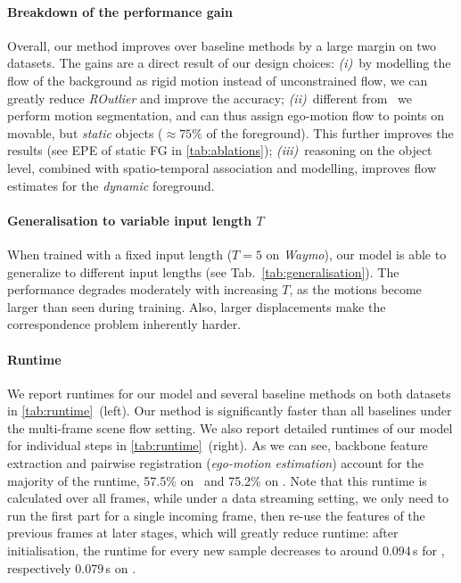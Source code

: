\paragraph{Breakdown of the performance gain}
Overall, our method improves over baseline methods by a large margin on two datasets. The gains are a direct result of our design choices: \textit{(i)}~by modelling the flow of the background as rigid motion instead of unconstrained flow, we can greatly reduce \emph{ROutlier} and improve the accuracy; \textit{(ii)}~different from~\cite{gojcic2021weakly} we perform motion segmentation, and can thus assign ego-motion flow to points on movable, but \emph{static} objects ($\approx75\%$ of the foreground). This further improves the results (see EPE of static FG in \cref{tab:ablations}); \textit{(iii)}~reasoning on the object level, combined with spatio-temporal association and modelling, improves flow estimates for the \textit{dynamic} foreground.

\paragraph{Generalisation to variable input length $T$}
\label{sec: more frames}
When trained with a fixed input length ($T=5$ on \emph{Waymo}), our model is able to generalize to different input lengths (see Tab.~\ref{tab:generalisation}). The performance degrades moderately with increasing $T$, as the motions become larger than seen during training. Also, larger displacements make the correspondence problem inherently harder.



\paragraph{Runtime}
We report runtimes for our model and several baseline methods on both datasets in \cref{tab:runtime}~(left). Our method is significantly faster than all baselines under the multi-frame scene flow setting. We also report detailed runtimes of our model for individual steps in \cref{tab:runtime}~(right). As we can see, backbone feature extraction and pairwise registration (\textit{ego-motion estimation}) account for the majority of the runtime, 57.5\% on \waymo~and 75.2\% on \nuscenes. Note that this runtime is calculated over all frames, while under a data streaming setting, we only need to run the first part for a single incoming frame, then re-use the features of the previous frames at later stages, which will greatly reduce runtime: after initialisation, the runtime for every new sample decreases to around 0.094$\,$s for \waymo, respectively 0.079$\,$s on \nuscenes. 

